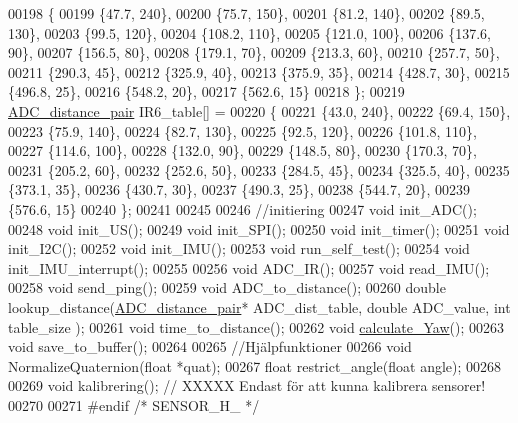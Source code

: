 \begin{DoxyCode}
00198 \{
00199     \{47.7, 240\},
00200     \{75.7, 150\},
00201     \{81.2, 140\},
00202     \{89.5, 130\},
00203     \{99.5, 120\},
00204     \{108.2, 110\},
00205     \{121.0, 100\},
00206     \{137.6, 90\},
00207     \{156.5, 80\},
00208     \{179.1, 70\},
00209     \{213.3, 60\},
00210     \{257.7, 50\},
00211     \{290.3, 45\},
00212     \{325.9, 40\},
00213     \{375.9, 35\},
00214     \{428.7, 30\},
00215     \{496.8, 25\},
00216     \{548.2, 20\},
00217     \{562.6, 15\}
00218 \};
00219 \hyperlink{struct_a_d_c__distance__pair}{ADC\_distance\_pair} IR6\_table[] =
00220 \{
00221     \{43.0, 240\},
00222     \{69.4, 150\},
00223     \{75.9, 140\},
00224     \{82.7, 130\},
00225     \{92.5, 120\},
00226     \{101.8, 110\},
00227     \{114.6, 100\},
00228     \{132.0, 90\},
00229     \{148.5, 80\},
00230     \{170.3, 70\},
00231     \{205.2, 60\},
00232     \{252.6, 50\},
00233     \{284.5, 45\},
00234     \{325.5, 40\},
00235     \{373.1, 35\},
00236     \{430.7, 30\},
00237     \{490.3, 25\},
00238     \{544.7, 20\},
00239     \{576.6, 15\}
00240 \};
00241 
00245 
00246 \textcolor{comment}{//initiering}
00247 \textcolor{keywordtype}{void} init\_ADC();
00248 \textcolor{keywordtype}{void} init\_US();
00249 \textcolor{keywordtype}{void} init\_SPI();
00250 \textcolor{keywordtype}{void} init\_timer();
00251 \textcolor{keywordtype}{void} init\_I2C();
00252 \textcolor{keywordtype}{void} init\_IMU();
00253 \textcolor{keywordtype}{void} run\_self\_test();
00254 \textcolor{keywordtype}{void} init\_IMU\_interrupt();
00255 
00256 \textcolor{keywordtype}{void} ADC\_IR();
00257 \textcolor{keywordtype}{void} read\_IMU();
00258 \textcolor{keywordtype}{void} send\_ping();
00259 \textcolor{keywordtype}{void} ADC\_to\_distance();
00260 \textcolor{keywordtype}{double} lookup\_distance(\hyperlink{struct_a_d_c__distance__pair}{ADC\_distance\_pair}* ADC\_dist\_table, \textcolor{keywordtype}{double} ADC\_value, \textcolor{keywordtype}{int} table\_size
      );
00261 \textcolor{keywordtype}{void} time\_to\_distance();
00262 \textcolor{keywordtype}{void} \hyperlink{state__machine_8h_a5611f3fef1c7ebe6f76d952adf576e86}{calculate\_Yaw}();
00263 \textcolor{keywordtype}{void} save\_to\_buffer();
00264 
00265 \textcolor{comment}{//Hjälpfunktioner}
00266 \textcolor{keywordtype}{void} NormalizeQuaternion(\textcolor{keywordtype}{float} *quat);
00267 \textcolor{keywordtype}{float} restrict\_angle(\textcolor{keywordtype}{float} angle);
00268 
00269 \textcolor{keywordtype}{void} kalibrering();     \textcolor{comment}{// XXXXX Endast för att kunna kalibrera sensorer!}
00270 
00271 \textcolor{preprocessor}{#endif }\textcolor{comment}{/* SENSOR\_H\_ */}\textcolor{preprocessor}{}
\end{DoxyCode}
